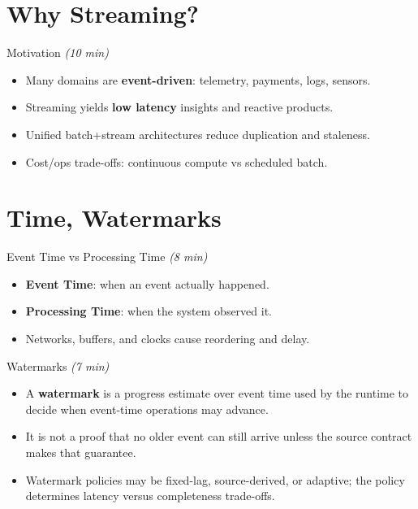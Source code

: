 \documentclass[aspectratio=169,11pt]{beamer}
\newcommand{\term}[1]{\textbf{#1}}
\newcommand{\mins}[1]{\textit{(#1 min)}}
\begin{document}
\section{Why Streaming?}
\begin{frame}{Motivation \mins{10}}
  \begin{itemize}
    \item Many domains are \term{event-driven}: telemetry, payments, logs, sensors.
    \item Streaming yields \term{low latency} insights and reactive products.
    \item Unified batch+stream architectures reduce duplication and staleness.
    \item Cost/ops trade-offs: continuous compute vs scheduled batch.
  \end{itemize}
\end{frame}

\section{Time, Watermarks}
\begin{frame}{Event Time vs Processing Time \mins{8}}
  \begin{itemize}
    \item \term{Event Time}: when an event actually happened.
    \item \term{Processing Time}: when the system observed it.
    \item Networks, buffers, and clocks cause reordering and delay.
  \end{itemize}
\end{frame}

\begin{frame}{Watermarks \mins{7}}
  \begin{itemize}
    \item A \term{watermark} is a progress estimate over event time used by the runtime to decide when event-time operations may advance.
    \item It is not a proof that no older event can still arrive unless the source contract makes that guarantee.
    \item Watermark policies may be fixed-lag, source-derived, or adaptive; the policy determines latency versus completeness trade-offs.
  \end{itemize}
\end{frame}
\end{document}
